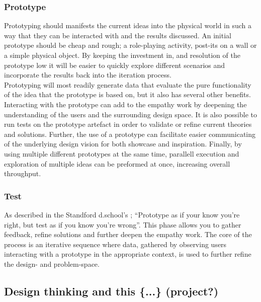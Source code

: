 \documentclass[a4paper,11pt]{article}
\begin{document}
    \subsubsection{Prototype}

      Prototyping should manifests the current ideas into the physical world in
      such a way that they can be interacted with and the results discussed. An
      initial prototype should be cheap and rough; a role-playing activity,
      post-its on a wall or a simple physical object. By keeping the investment
      in, and resolution of the prototype low it will be easier to quickly explore
      different scenarios and incorporate the results back into the iteration
      process. \\

      Prototyping will most readily generate data that evaluate the pure
      functionality of the idea that the prototype is based on, but it also has
      several other benefits. Interacting with the prototype can add to the
      empathy work by deepening the understanding of the users and the
      surrounding design space.  It is also possible to run tests on the
      prototype artefact in order to validate or refine current theories and
      solutions.  Further, the use of a prototype can facilitate easier
      communicating of the underlying design vision for both showcase and
      inspiration. Finally, by using multiple different prototypes at the same
      time, parallell execution and exploration of multiple ideas can be
      preformed at once, increasing overall throughput.

    \subsubsection{Test}

    As described in the Standford d.school's {\stanfordBootleg}%
    \cite[v]{c_design_thinking_online_nonpeer_dschool_stanford};
      \enquote{Prototype as if your know you're right, but test as if you know
        you're wrong}. This phase allows you to gather feedback, refine
      solutions and further deepen the empathy work. The core of the process is
      an iterative sequence where data, gathered by observing users  interacting
      with a prototype in the appropriate context, is used to further refine the
      design- and problem-space.

  \subsection{Design thinking and this \{...\} (project?)}
\end{document}
